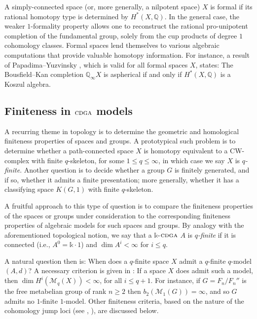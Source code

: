 \documentclass{article}
\numberwithin{equation}{section}
\theoremstyle{definition}
\newcommand{\Q}{\mathbb{Q}}
\renewcommand{\k}{\mathbb{k}}
\newcommand{\M}{\mathcal{M}}
\newcommand{\cdga}{\ensuremath{\textsc{cdga}}}
\begin{document}
A simply-connected space (or, more generally, a nilpotent space) 
$X$ is formal if its rational homotopy type is determined by $H^*(X,\Q)$. 
In the general case, the weaker $1$-formality property allows one to 
reconstruct the rational pro-unipotent completion of the fundamental 
group, solely from the cup products of degree $1$ cohomology classes. 
Formal spaces lend themselves to various algebraic computations that 
provide valuable homotopy information. For instance, a result of 
Papadima--Yuzvinsky \cite{PY99}, which is valid for all formal spaces 
$X$, states:  The Bousfield--Kan completion $\Q_{\infty}X$ is 
aspherical if and only if $H^*(X,\Q)$ is a Koszul algebra.
 
\subsection{Finiteness in $\cdga$ models}
\label{subsec:intro-finite}

A recurring theme in topology is to determine the geometric and homological 
finiteness properties of spaces and groups. A prototypical such problem is 
to determine whether a path-connected space $X$ is homotopy equivalent 
to a CW-complex with finite $q$-skeleton, for some $1\le q \le \infty$, 
in which case we say $X$ is {\em $q$-finite}.  Another question  
is to decide whether a group $G$ is finitely generated, and if so, 
whether it admits a finite presentation; more generally, whether 
it has a classifying space $K(G,1)$ with finite $q$-skeleton. 

A fruitful approach to this type of question is to compare 
the finiteness properties of the spaces or groups under 
consideration to the corresponding finiteness properties 
of algebraic models for such spaces and groups. 
By analogy with the aforementioned 
topological notion, we say that a $\k$-$\cdga$ $A$ is 
{\em $q$-finite}\/ if it is connected (i.e., $A^0= \k \cdot 1$) 
and $\dim A^i < \infty$ for $i\le q$. 

A natural question then is:
When does a $q$-finite space $X$ admit a $q$-finite $q$-model $(A,d)$?
A necessary criterion is given in \cite{PS-jlms}: If a space $X$ does admit 
such a model, then $\dim H^i(\M_q(X))< \infty$, for all $i\le q+1$. 
For instance, if $G= F_n/F_n''$ is the free metabelian group of rank $n\ge 2$
then $b_2(\M_1(G))= \infty$, and so $G$ admits no $1$-finite $1$-model. 
Other finiteness criteria, based on the nature of the cohomology jump loci 
(see \cite{PS-jlms}, \cite{Su-mm}), are discussed below.
\end{document}

